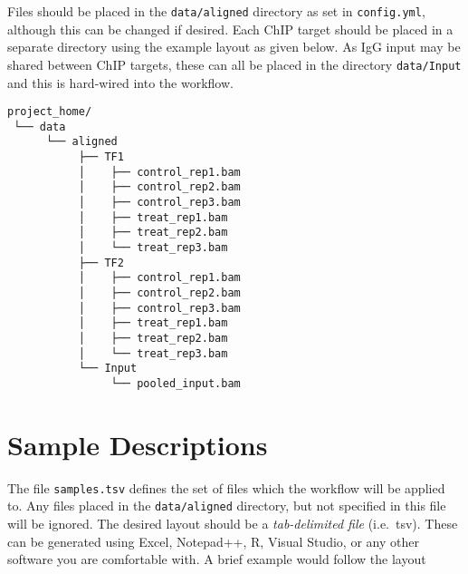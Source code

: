\documentclass[
]{book}
\begin{document}
Files should be placed in the \texttt{data/aligned} directory as set in \texttt{config.yml}, although this can be changed if desired.
Each ChIP target should be placed in a separate directory using the example layout as given below.
As IgG input may be shared between ChIP targets, these can all be placed in the directory \texttt{data/Input} and this is hard-wired into the workflow.

\begin{verbatim}
project_home/
 └── data
      └── aligned 
           ├── TF1 
           │    ├── control_rep1.bam
           │    ├── control_rep2.bam
           │    ├── control_rep3.bam
           │    ├── treat_rep1.bam
           │    ├── treat_rep2.bam
           │    └── treat_rep3.bam
           ├── TF2 
           │    ├── control_rep1.bam
           │    ├── control_rep2.bam
           │    ├── control_rep3.bam
           │    ├── treat_rep1.bam
           │    ├── treat_rep2.bam
           │    └── treat_rep3.bam           
           └── Input
                └── pooled_input.bam 
\end{verbatim}

\hypertarget{sample-descriptions}{%
\section{Sample Descriptions}\label{sample-descriptions}}

The file \texttt{samples.tsv} defines the set of files which the workflow will be applied to.
Any files placed in the \texttt{data/aligned} directory, but not specified in this file will be ignored.
The desired layout should be a \emph{tab-delimited file} (i.e.~tsv).
These can be generated using Excel, Notepad++, R, Visual Studio, or any other software you are comfortable with.
A brief example would follow the layout
\end{document}
